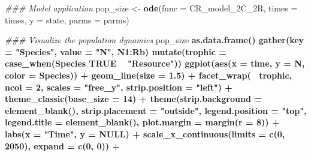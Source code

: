 \documentclass[
]{book}
\newenvironment{Shaded}{\begin{snugshade}}{\end{snugshade}}
\newcommand{\CommentTok}[1]{\textcolor[rgb]{0.56,0.35,0.01}{\textit{#1}}}
\newcommand{\DataTypeTok}[1]{\textcolor[rgb]{0.13,0.29,0.53}{#1}}
\newcommand{\DecValTok}[1]{\textcolor[rgb]{0.00,0.00,0.81}{#1}}
\newcommand{\FloatTok}[1]{\textcolor[rgb]{0.00,0.00,0.81}{#1}}
\newcommand{\KeywordTok}[1]{\textcolor[rgb]{0.13,0.29,0.53}{\textbf{#1}}}
\newcommand{\NormalTok}[1]{#1}
\newcommand{\OperatorTok}[1]{\textcolor[rgb]{0.81,0.36,0.00}{\textbf{#1}}}
\newcommand{\OtherTok}[1]{\textcolor[rgb]{0.56,0.35,0.01}{#1}}
\newcommand{\StringTok}[1]{\textcolor[rgb]{0.31,0.60,0.02}{#1}}
\begin{document}
\begin{Shaded}
\begin{Highlighting}[]
\CommentTok{### Model application}
\NormalTok{pop_size <-}\StringTok{ }\KeywordTok{ode}\NormalTok{(}\DataTypeTok{func =}\NormalTok{ CR_model_2C_2R, }\DataTypeTok{times =}\NormalTok{ times, }\DataTypeTok{y =}\NormalTok{ state, }\DataTypeTok{parms =}\NormalTok{ parms)}


\CommentTok{### Visualize the population dynamics}
\NormalTok{pop_size }\OperatorTok{%
\StringTok{  }\KeywordTok{as.data.frame}\NormalTok{() }\OperatorTok{%
\StringTok{  }\KeywordTok{gather}\NormalTok{(}\DataTypeTok{key =} \StringTok{"Species"}\NormalTok{, }\DataTypeTok{value =} \StringTok{"N"}\NormalTok{, N1}\OperatorTok{:}\NormalTok{Rb) }\OperatorTok{%
\StringTok{  }\KeywordTok{mutate}\NormalTok{(}\DataTypeTok{trophic =} \KeywordTok{case_when}\NormalTok{(Species }\OperatorTok{%
                             \OtherTok{TRUE} \OperatorTok{~}\StringTok{ "Resource"}\NormalTok{)) }\OperatorTok{%
\StringTok{  }\KeywordTok{ggplot}\NormalTok{(}\KeywordTok{aes}\NormalTok{(}\DataTypeTok{x =}\NormalTok{ time, }\DataTypeTok{y =}\NormalTok{ N, }\DataTypeTok{color =}\NormalTok{ Species)) }\OperatorTok{+}\StringTok{ }
\StringTok{  }\KeywordTok{geom_line}\NormalTok{(}\DataTypeTok{size =} \FloatTok{1.5}\NormalTok{) }\OperatorTok{+}
\StringTok{  }\KeywordTok{facet_wrap}\NormalTok{(}\OperatorTok{~}\StringTok{ }\NormalTok{trophic, }
             \DataTypeTok{ncol =} \DecValTok{2}\NormalTok{, }
             \DataTypeTok{scales =} \StringTok{"free_y"}\NormalTok{,}
             \DataTypeTok{strip.position =} \StringTok{"left"}\NormalTok{) }\OperatorTok{+}
\StringTok{  }\KeywordTok{theme_classic}\NormalTok{(}\DataTypeTok{base_size =} \DecValTok{14}\NormalTok{) }\OperatorTok{+}
\StringTok{  }\KeywordTok{theme}\NormalTok{(}\DataTypeTok{strip.background =} \KeywordTok{element_blank}\NormalTok{(),}
        \DataTypeTok{strip.placement =} \StringTok{"outside"}\NormalTok{,}
        \DataTypeTok{legend.position =} \StringTok{"top"}\NormalTok{,}
        \DataTypeTok{legend.title =} \KeywordTok{element_blank}\NormalTok{(),}
        \DataTypeTok{plot.margin =} \KeywordTok{margin}\NormalTok{(}\DataTypeTok{r =} \DecValTok{8}\NormalTok{)) }\OperatorTok{+}\StringTok{ }
\StringTok{  }\KeywordTok{labs}\NormalTok{(}\DataTypeTok{x =} \StringTok{"Time"}\NormalTok{, }\DataTypeTok{y =} \OtherTok{NULL}\NormalTok{) }\OperatorTok{+}
\StringTok{  }\KeywordTok{scale_x_continuous}\NormalTok{(}\DataTypeTok{limits =} \KeywordTok{c}\NormalTok{(}\DecValTok{0}\NormalTok{, }\DecValTok{2050}\NormalTok{), }\DataTypeTok{expand =} \KeywordTok{c}\NormalTok{(}\DecValTok{0}\NormalTok{, }\DecValTok{0}\NormalTok{)) }\OperatorTok{+}
}}}}}
\end{Highlighting}
\end{Shaded}
\end{document}
